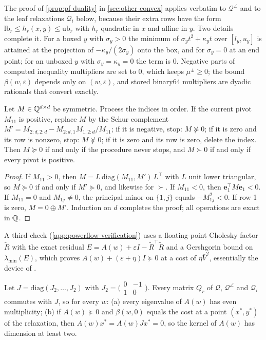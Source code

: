 The proof of \cref{prop:pf-duality} in \cref{sec:other-convex} applies verbatim to $\mathcal Q^\angle$ and to the leaf relaxations $\mathcal Q_i$ below, because their extra rows have the form $\mathrm{lb}_r\le h_r(x,y)\le\mathrm{ub}_r$ with $h_r$ quadratic in $x$ and affine in $y$.
Two details complete it.
For a boxed $y$ with $\sigma_y>0$ the minimum of $\sigma_yt^2+\kappa_yt$ over $[l_y,u_y]$ is attained at the projection of $-\kappa_y/(2\sigma_y)$ onto the box, and for $\sigma_y=0$ at an end point; for an unboxed $y$ with $\sigma_y=\kappa_y=0$ the term is $0$.
Negative parts of computed inequality multipliers are set to $0$, which keeps $\mu^\pm\ge0$; the bound $\beta(w,\varepsilon)$ depends only on $(w,\varepsilon)$, and stored binary64 multipliers are dyadic rationals that convert exactly.

\begin{lemma}\label{lem:pf-psd}
Let $M\in\mathbb{Q}^{d\times d}$ be symmetric.
Process the indices in order.
If the current pivot $M_{11}$ is positive, replace $M$ by the Schur complement $M'=M_{2:d,2:d}-M_{2:d,1}M_{1,2:d}/M_{11}$;
if it is negative, stop: $M\not\succeq0$;
if it is zero and its row is nonzero, stop: $M\not\succeq0$;
if it is zero and its row is zero, delete the index.
Then $M\succeq0$ if and only if the procedure never stops, and $M\succ0$ if and only if every pivot is positive.
\end{lemma}

\begin{proof}
If $M_{11}>0$, then $M=L\,\mathrm{diag}(M_{11},M')\,L^\top$ with $L$ unit lower triangular, so $M\succeq0$ if and only if $M'\succeq0$, and likewise for $\succ$.
If $M_{11}<0$, then $\mathbf e_1^\top M\mathbf e_1<0$.
If $M_{11}=0$ and $M_{1j}\ne0$, the principal minor on $\{1,j\}$ equals $-M_{1j}^2<0$.
If row 1 is zero, $M=0\oplus M'$.
Induction on $d$ completes the proof; all operations are exact in $\mathbb{Q}$.
\end{proof}

A third check (\cref{app:powerflow-verification}) uses a floating-point Cholesky factor $\tilde R$ with the exact residual $E=A(w)+\varepsilon I-\tilde R^\top\tilde R$ and a Gershgorin bound on $\lambda_{\min}(E)$, which proves $A(w)+(\varepsilon+\eta)I\succeq0$ at a cost of $\eta\bar V^2$, essentially the device of \citet{oustry2022-certified-and-accurate-sdp-bounds}.

\begin{proposition}\label{prop:pf-double}
Let $J=\mathrm{diag}(J_2,\dots,J_2)$ with $J_2=\bigl(\begin{smallmatrix}0&-1\\1&0\end{smallmatrix}\bigr)$.
Every matrix $Q_r$ of $\mathcal Q$, $\mathcal Q^\angle$ and $\mathcal Q_i$ commutes with $J$, so for every $w$:
(a) every eigenvalue of $A(w)$ has even multiplicity;
(b) if $A(w)\succeq0$ and $\beta(w,0)$ equals the cost at a point $(x^*,y^*)$ of the relaxation, then $A(w)x^*=A(w)Jx^*=0$, so the kernel of $A(w)$ has dimension at least two.
\end{proposition}

